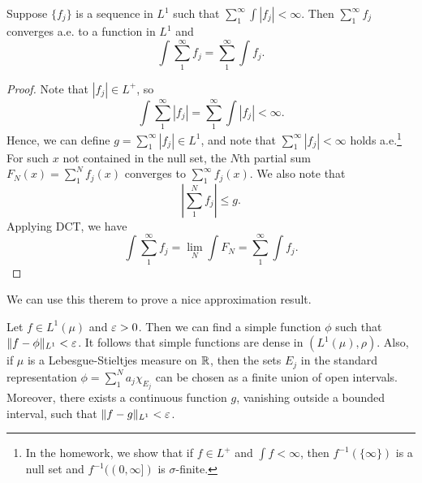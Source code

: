 \documentclass[12pt]{article} %
\begin{document}
\begin{theorem}
    Suppose $\{f_j\}$ is a sequence in $L^1$ such that $\sum_1^\infty \int |f_j| < \infty$. Then $\sum_1^\infty f_j$ converges a.e. to a function in $L^1$ and \[\int \sum_1^\infty f_j = \sum_1^\infty \int f_j.\]
\end{theorem}

\begin{proof}
    Note that $|f_j| \in L^+$, so \[\int \sum_1^\infty |f_j| = \sum_1^\infty \int |f_j| < \infty.\] Hence, we can define $g = \sum_1^\infty |f_j| \in L^1$, and note that $\sum_1^\infty |f_j| < \infty$ holds a.e.\footnote{In the homework, we show that if $f \in L^+$ and $\int f < \infty$, then $f^{-1}(\{\infty\})$ is a null set and $f^{-1}((0, \infty])$ is $\sigma$-finite.} For such $x$ not contained in the null set, the $N$th partial sum $F_N(x) = \sum_1^N f_j(x)$ converges to $\sum_1^\infty f_j(x)$. We also note that \[\left|\sum_1^N f_j \right| \leq g.\] Applying DCT, we have \[\int \sum_1^\infty f_j = \lim_N \int F_N = \sum_1^\infty \int f_j.\]
\end{proof}

We can use this therem to prove a nice approximation result.

\begin{theorem}
    Let $f \in L^1(\mu)$ and $\varepsilon > 0$. Then we can find a simple function $\phi$ such that $\|f - \phi\|_{L^1} < \varepsilon$. It follows that simple functions are dense in $(L^1(\mu), \rho)$. Also, if $\mu$ is a Lebesgue-Stieltjes measure on $\mathbb{R}$, then the sets $E_j$ in the standard representation $\phi = \sum_1^N a_j \chi_{E_j}$ can be chosen as a finite union of open intervals. Moreover, there exists a continuous function $g$, vanishing outside a bounded interval, such that $\|f - g\|_{L^1} < \varepsilon$.
\end{theorem}
\end{document}
